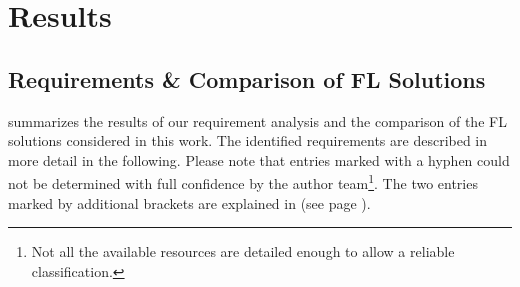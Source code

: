 \section{Results}
\label{sec:Results}

\subsection{Requirements \& Comparison of FL Solutions}
\label{subsec:ResultsRequirements}

 summarizes the results of our requirement analysis and the comparison of the FL solutions considered in this work. The identified requirements are described in more detail in the following. Please note that entries marked with a hyphen could not be determined with full confidence by the author team\footnote{Not all the available resources are detailed enough to allow a reliable classification.}.
The two entries marked by additional brackets are explained in  (see page \pageref{subsec:DiscussionRequirements}).


